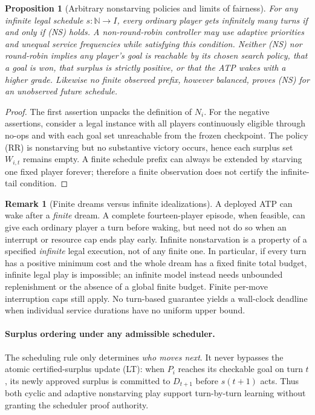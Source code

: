 \documentclass[11pt,letterpaper]{article}
\theoremstyle{definition}
\theoremstyle{plain}
\newtheorem{proposition}[definition]{Proposition}
\theoremstyle{definition}
\newtheorem{remark}[definition]{Remark}
\begin{document}
\begin{proposition}[Arbitrary nonstarving policies and limits of fairness]
For any infinite legal schedule $s:\mathbb N\to I$, every ordinary player gets infinitely many turns \emph{if and only if} (NS) holds. A non-round-robin controller may use adaptive priorities and unequal service frequencies while satisfying this condition. Neither (NS) nor round-robin implies any player's goal is reachable by its chosen search policy, that a goal is won, that surplus is strictly positive, or that the ATP wakes with a higher grade. Likewise no finite observed prefix, however balanced, proves (NS) for an unobserved future schedule.
\end{proposition}
\begin{proof}
The first assertion unpacks the definition of $N_i$. For the negative assertions, consider a legal instance with all players continuously eligible through no-ops and with each goal set unreachable from the frozen checkpoint. The policy (RR) is nonstarving but no substantive victory occurs, hence each surplus set $W_{i,t}$ remains empty. A finite schedule prefix can always be extended by starving one fixed player forever; therefore a finite observation does not certify the infinite-tail condition.
\end{proof}

\begin{remark}[Finite dreams versus infinite idealizations]
A deployed ATP can wake after a \emph{finite} dream. A complete fourteen-player episode, when feasible, can give each ordinary player a turn before waking, but need not do so when an interrupt or resource cap ends play early. Infinite nonstarvation is a property of a specified \emph{infinite} legal execution, not of any finite one. In particular, if every turn has a positive minimum cost and the whole dream has a fixed finite total budget, infinite legal play is impossible; an infinite model instead needs unbounded replenishment or the absence of a global finite budget. Finite per-move interruption caps still apply. No turn-based guarantee yields a wall-clock deadline when individual service durations have no uniform upper bound.
\end{remark}

\paragraph{Surplus ordering under any admissible scheduler.}
The scheduling rule only determines \emph{who moves next}. It never bypasses the atomic certified-surplus update (LT): when $P_i$ reaches its checkable goal on turn $t$, its newly approved surplus is committed to $D_{t+1}$ before $s(t+1)$ acts. Thus both cyclic and adaptive nonstarving play support turn-by-turn learning without granting the scheduler proof authority.
\end{document}
